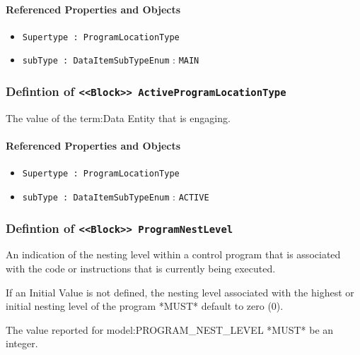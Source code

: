\FloatBarrier
\paragraph{Referenced Properties and Objects}

\begin{itemize}
\item \texttt{Supertype : ProgramLocationType}

\item \texttt{subType : DataItemSubTypeEnum} : \texttt{MAIN}

\end{itemize}
\FloatBarrier
\subsubsection{Defintion of \texttt{<<Block>> ActiveProgramLocationType}}
  \label{type:ActiveProgramLocationType}

\FloatBarrier

The value of the {term:Data Entity} that is engaging.

\FloatBarrier
\paragraph{Referenced Properties and Objects}

\begin{itemize}
\item \texttt{Supertype : ProgramLocationType}

\item \texttt{subType : DataItemSubTypeEnum} : \texttt{ACTIVE}

\end{itemize}
\FloatBarrier
\subsubsection{Defintion of \texttt{<<Block>> ProgramNestLevel}}
  \label{type:ProgramNestLevel}

\FloatBarrier

An indication of the nesting level within a control program that is associated with the code or instructions that is currently being executed.
  
 If an Initial Value is not defined, the nesting level associated with the highest or initial nesting level of the program *MUST* default to zero (0).
  
 The value reported for {model:PROGRAM_NEST_LEVEL} *MUST* be an integer.

